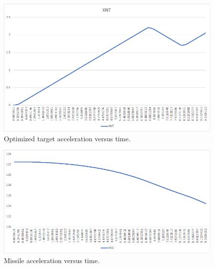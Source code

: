  \begin{figure}[H]
	\centering
	\includegraphics[scale = 0.70]{fig/XNT.PNG}
	\caption{Optimized target acceleration versus time.}
	\label{XNT}
\end{figure}

 \begin{figure}[H]
	\centering
	\includegraphics[scale = 0.70]{fig/XNC.PNG}
	\caption{Missile acceleration versus time.}
	\label{XNC}
\end{figure}


